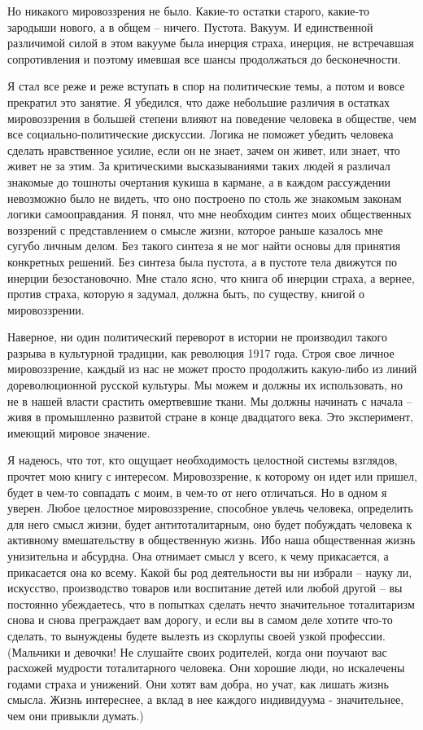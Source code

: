 \documentclass{book}
\begin{document}
Но никакого мировоззрения не было. Какие-то остатки старого, какие-то зародыши нового, а в общем -- ничего. Пустота. Вакуум. И единственной различимой силой в этом вакууме была инерция страха, инерция, не встречавшая сопротивления и поэтому имевшая все шансы продолжаться до бесконечности.

Я стал все реже и реже вступать в спор на политические те­мы, а потом и вовсе прекратил это занятие. Я убедился, что да­же небольшие различия в остатках мировоззрения в большей степени влияют на поведение человека в обществе, чем все со­циально-политические дискуссии. Логика не поможет убедить человека сделать нравственное усилие, если он не знает, зачем он живет, или знает, что живет не за этим. За критическими вы­сказываниями таких людей я различал знакомые до тошноты очертания кукиша в кармане, а в каждом рассуждении невоз­можно было не видеть, что оно построено по столь же знакомым законам логики самооправдания. Я понял, что мне необходим синтез моих общественных воззрений с представлением о смыс­ле жизни, которое раньше казалось мне сугубо личным делом. Без такого синтеза я не мог найти основы для принятия кон­кретных решений. Без синтеза была пустота, а в пустоте тела движутся по инерции безостановочно. Мне стало ясно, что книга об инерции страха, а вернее, против  страха, которую я задумал, должна 
быть, по существу, книгой о мировоззрении.

Наверное, ни один политический переворот в истории не про­изводил такого разрыва в культурной традиции, как револю­ция 1917 года. Строя свое личное мировоззрение, каждый из нас не может просто продолжить какую-либо из линий дорево­люционной русской культуры. Мы можем и должны их исполь­зовать, но не в нашей власти срастить омертвевшие ткани. Мы должны начинать с начала -- живя в промышленно развитой стране в конце двадцатого века. Это эксперимент, имеющий ми­ровое значение.

Я надеюсь, что тот, кто ощущает необходимость целостной системы взглядов, прочтет мою книгу с интересом. Мировоз­зрение, к которому он идет или пришел, будет в чем-то совпа­дать с моим, в чем-то от него отличаться. Но в одном я уверен. Любое целостное мировоззрение, способное увлечь человека, определить для него смысл жизни, будет антитоталитарным, оно будет побуждать человека к активному вмешательству в общественную жизнь. Ибо наша общественная жизнь унизитель­на и абсурдна. Она отнимает смысл у всего, к чему прикасается, а прикасается она ко всему. Какой бы род деятельности вы ни избрали -- науку ли, искусство, производство товаров или вос­питание детей или любой другой -- вы постоянно убеждаетесь, что в попытках сделать нечто значительное тоталитаризм снова и снова преграждает вам дорогу, и если вы в самом деле хоти­те что-то сделать, то вынуждены будете вылезть из скорлупы своей узкой профессии. (Мальчики и девочки! Не слушайте сво­их родителей, когда они поучают вас расхожей мудрости тота­литарного 
человека. Они хорошие люди, но искалечены годами страха и унижений. Они хотят вам добра, но учат, как лишать жизнь смысла. Жизнь интереснее, а вклад в нее каждого инди­видуума - значительнее, чем они привыкли думать.)
\end{document}
